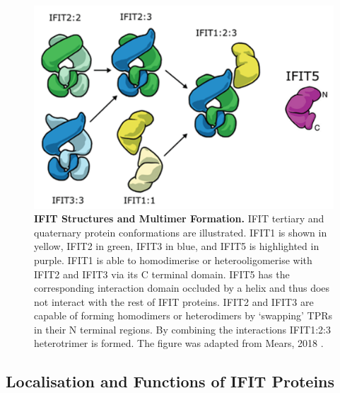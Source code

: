 \begin{figure}
    \centering
    \includegraphics[width=0.75\linewidth]{04. Introduction//Figs/05. IFIT-complexes.png}
    \caption[IFIT Structures and Multimer Formation.]{\textbf{IFIT Structures and Multimer Formation.} IFIT tertiary and quaternary protein conformations are illustrated. IFIT1 is shown in yellow, IFIT2 in green, IFIT3 in blue, and IFIT5 is highlighted in purple. IFIT1 is able to homodimerise or heterooligomerise with IFIT2 and IFIT3 via its C terminal domain. IFIT5 has the corresponding interaction domain occluded by a helix and thus does not interact with the rest of IFIT proteins. IFIT2 and IFIT3 are capable of forming homodimers or heterodimers by ‘swapping’ TPRs in their N terminal regions. By combining the interactions IFIT1:2:3 heterotrimer is formed. The figure was adapted from Mears, 2018 \cite{Mears2018BetterResponse}.}
    \label{fig:IFIT Structures and Multimer Formation.}
\end{figure}

\subsection{Localisation and Functions of IFIT Proteins} \label{subsec:Localisation and Functions of IFIT Proteins}
